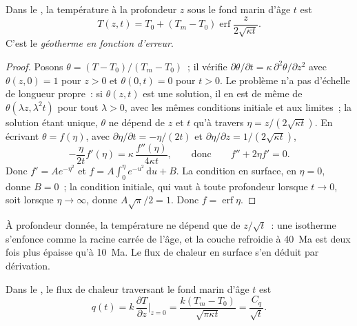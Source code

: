 \begin{theorem}\label{thm:b3:lithosphere-thermal-models:erf}
Dans le , la température à la profondeur $z$ sous le
fond marin d'âge $t$ est
\[
  T(z, t) = T_0 + (T_m - T_0)\operatorname{erf}\frac{z}{2\sqrt{\kappa t}} .
\]
C'est le \emph{géotherme en fonction d'erreur}.
\end{theorem}

\begin{proof}
Posons $\theta = (T - T_0)/(T_m - T_0)$~; il vérifie $\partial\theta/\partial t =
\kappa\,\partial^2\theta/\partial z^2$ avec $\theta(z, 0) = 1$ pour $z > 0$ et
$\theta(0, t) = 0$ pour $t > 0$. Le problème n'a pas d'échelle de longueur propre~:
si $\theta(z, t)$ est une solution, il en est de même de $\theta(\lambda z, \lambda^2t)$ pour tout
$\lambda > 0$, avec les mêmes conditions initiale et aux limites~; la solution étant
unique, $\theta$ ne dépend de $z$ et $t$ qu'à travers $\eta = z/(2\sqrt{\kappa
t})$. En écrivant $\theta = f(\eta)$, avec $\partial\eta/\partial t = -\eta/(2t)$ et
$\partial\eta/\partial z = 1/(2\sqrt{\kappa t})$,
\[
  -\frac{\eta}{2t}f'(\eta) = \kappa\,\frac{f''(\eta)}{4\kappa t},
  \qquad\text{donc}\qquad f'' + 2\eta f' = 0 .
\]
Donc $f' = Ae^{-\eta^2}$ et $f = A\int_0^\eta e^{-u^2}\,\mathrm du + B$. La
condition en surface, en $\eta = 0$, donne $B = 0$~; la condition initiale, qui
vaut à toute profondeur lorsque $t \to 0$, soit lorsque $\eta \to \infty$, donne
$A\sqrt\pi/2 = 1$. Donc $f = \operatorname{erf}\eta$.
\end{proof}

À profondeur donnée, la température ne dépend que de $z/\sqrt t$~: une isotherme s'enfonce
comme la racine carrée de l'âge, et la couche refroidie à \qty{40}{Ma} est deux fois
plus épaisse qu'à \qty{10}{Ma}. Le flux de chaleur en surface s'en déduit par dérivation.

\begin{proposition}\label{prop:b3:lithosphere-thermal-models:heat-flow}
Dans le , le flux de chaleur traversant le fond marin d'âge $t$
est
\[
  q(t) = k\,\frac{\partial T}{\partial z}\Big|_{z=0}
  = \frac{k(T_m - T_0)}{\sqrt{\pi\kappa t}} = \frac{C_q}{\sqrt t} .
\]
\end{proposition}

